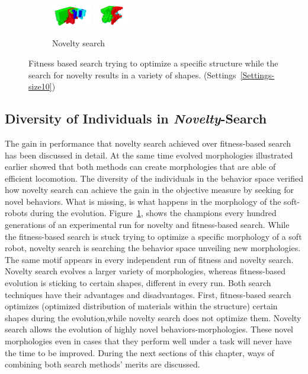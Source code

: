 \begin{figure}[t!]
\begin{subfigure}[b]{1.0\textwidth}
\includegraphics[width=0.19\textwidth]{../Figures/Robots/n_4_g_900.jpg}
\includegraphics[width=0.19\textwidth]{../Figures/Robots/n_4_g_1000.jpg}
\caption{Novelty search}
\end{subfigure}
\caption{Fitness based search trying to optimize a specific structure while the search for novelty results in a variety of shapes. (Settings~\ref{Settings-size10})}
\label{fig:morphologies}
\end{figure}


\subsection{Diversity of Individuals in \emph{Novelty}-Search}

The gain in performance that novelty search achieved over fitness-based search has been discussed in detail.  At the same time evolved morphologies illustrated earlier showed that both methods can create morphologies that are able of efficient locomotion. The diversity of the individuals in the behavior space verified how novelty search can achieve the gain in the objective measure by seeking for novel behaviors. What is missing, is what happens in the morphology of the soft-robots during the evolution. Figure~\ref{fig:morphologies}, shows the champions every hundred generations of an experimental run for novelty and fitness-based search. While the fitness-based search is stuck trying to optimize a specific morphology of a soft robot, novelty search is searching the behavior space unveiling new morphologies. The same motif appears in every independent run of fitness and novelty search. Novelty search evolves a larger variety of morphologies, whereas fitness-based evolution is sticking to certain shapes, different in every run. Both search techniques have their advantages and disadvantages. First, fitness-based search optimizes (optimized distribution of materials within the structure) certain shapes during the evolution,while novelty search does not optimize them. Novelty search allows the evolution of highly novel behaviors-morphologies. These novel morphologies even in cases that they perform well under a task will never have the time to be improved. During the next sections of this chapter, ways of combining both search methods' merits are discussed.

